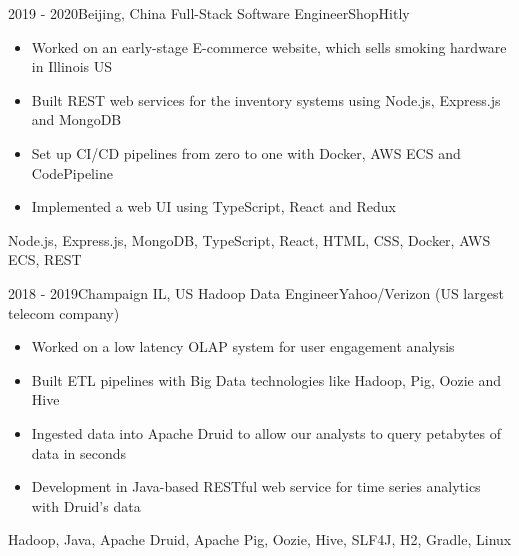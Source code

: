 \begin{experiences}
\experience
{2019 - 2020}{Beijing, China}
{Full-Stack Software Engineer}{ShopHitly}
{
    \begin{itemize}
    \item Worked on an early-stage E-commerce website, which sells smoking hardware in Illinois US
    \item Built REST web services for the inventory systems using Node.js, Express.js and MongoDB
    \item Set up CI/CD pipelines from zero to one with Docker, AWS ECS and CodePipeline
    \item Implemented a web UI using TypeScript, React and Redux
    \end{itemize}
}
{Node.js, Express.js, MongoDB, TypeScript, React, HTML, CSS, Docker, AWS ECS, REST}

\emptySeparator

\experience
{2018 - 2019}{Champaign IL, US}
{Hadoop Data Engineer}{Yahoo/Verizon (US largest telecom company)}
{
    \begin{itemize}
    \item Worked on a low latency OLAP system for user engagement analysis
    \item Built ETL pipelines with Big Data technologies like Hadoop, Pig, Oozie and Hive
    \item Ingested data into Apache Druid to allow our analysts to query petabytes of data in seconds
    \item Development in Java-based RESTful web service for time series analytics with Druid's data
    \end{itemize}
}
{Hadoop, Java, Apache Druid, Apache Pig, Oozie, Hive, SLF4J, H2, Gradle, Linux}

\end{experiences}
